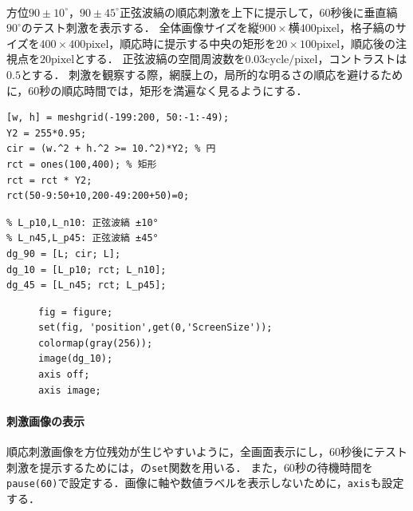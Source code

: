 \paragraph{\kadaicb}
方位\(90\pm 10^\circ\)，\(90\pm 45^\circ\)正弦波縞の順応刺激を上下に提示して，\(60\)秒後に垂直縞\(90^\circ\)のテスト刺激を表示する．
全体画像サイズを\(\textrm{縦}900\times\textrm{横}400\textrm{pixel}\)，格子縞のサイズを\(400\times 400\textrm{pixel}\)，順応時に提示する中央の矩形を\(20\times 100\textrm{pixel}\)，順応後の注視点を\(20\textrm{pixel}\)とする．
正弦波縞の空間周波数を\(0.03\textrm{cycle}/\textrm{pixel}\)，コントラストは\(0.5\)とする．
刺激を観察する際，網膜上の，局所的な明るさの順応を避けるために，\(60\)秒の順応時間では，矩形を満遍なく見るようにする．
\begin{center}
    \begin{minipage}[t]{.48\textwidth}
        \begin{lstlisting}[caption={矩形と円の作成},label={src:矩形と円の作成}]
[w, h] = meshgrid(-199:200, 50:-1:-49);
Y2 = 255*0.95;
cir = (w.^2 + h.^2 >= 10.^2)*Y2; % 円
rct = ones(100,400); % 矩形
rct = rct * Y2;
rct(50-9:50+10,200-49:200+50)=0;
        \end{lstlisting}
    \end{minipage}
    \hspace{1em}
    \begin{minipage}[t]{.48\textwidth}
        \begin{lstlisting}[caption={順応刺激画像の作成},label={src:順応刺激画像の作成}]
% L: 正弦波縞 90°
% L_p10,L_n10: 正弦波縞 ±10° 
% L_n45,L_p45: 正弦波縞 ±45°
dg_90 = [L; cir; L];
dg_10 = [L_p10; rct; L_n10];
dg_45 = [L_n45; rct; L_p45];
        \end{lstlisting}
    \end{minipage}
\end{center}

\begin{figure}
    \vspace{-1cm}
    \begin{lstlisting}[caption={刺激画像の表示方法},label={src:刺激画像の表示方法}]
fig = figure;
set(fig, 'position',get(0,'ScreenSize'));
colormap(gray(256));
image(dg_10);
axis off;
axis image;    
    \end{lstlisting}
\end{figure}
\paragraph{刺激画像の表示}
順応刺激画像を方位残効が生じやすいように，全画面表示にし，\(60\)秒後にテスト刺激を提示するためには，\matlab の\texttt{set}関数を用いる．
また，\(60\)秒の待機時間を\texttt{pause(60)}で設定する．画像に軸や数値ラベルを表示しないために，\texttt{axis}も設定する．
